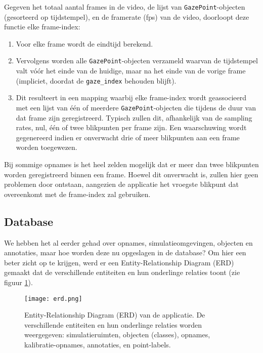Gegeven het totaal aantal frames in de video, de lijst van \texttt{GazePoint}-objecten (gesorteerd op tijdstempel), 
en de framerate (fps) van de video, doorloopt deze functie elke frame-index:
\begin{enumerate}
  \item Voor elke frame wordt de eindtijd berekend.
  \item Vervolgens worden alle \texttt{GazePoint}-objecten verzameld waarvan de tijdstempel valt vóór het einde van de huidige, 
  maar na het einde van de vorige frame (impliciet, doordat de \texttt{gaze\_index} behouden blijft).
  \item Dit resulteert in een mapping waarbij elke frame-index wordt geassocieerd met een lijst van één of meerdere 
  \texttt{GazePoint}-objecten die tijdens de duur van dat frame zijn geregistreerd. 
  Typisch zullen dit, afhankelijk van de sampling rates, nul, één of twee blikpunten per frame zijn. 
  Een waarschuwing wordt gegenereerd indien er onverwacht drie of meer blikpunten aan een frame worden toegewezen.
\end{enumerate}

Bij sommige opnames is het heel zelden mogelijk dat er meer dan twee blikpunten worden geregistreerd binnen een frame.
Hoewel dit onverwacht is, zullen hier geen problemen door ontstaan, aangezien de 
applicatie het vroegste blikpunt dat overeenkomt met de frame-index zal gebruiken.

\subsection{Database}

We hebben het al eerder gehad over opnames, simulatieomgevingen, objecten en annotaties, maar hoe worden deze nu opgeslagen in de database?
Om hier een beter zicht op te krijgen, werd er een Entity-Relationship Diagram (ERD) gemaakt dat de verschillende entiteiten en hun onderlinge relaties toont (zie figuur \ref{fig:erd}).

\begin{figure}[H]
  \centering
  \texttt{[image: erd.png]}
  \caption[
Entity-Relationship Diagram (ERD) van de applicatie
  ]{\label{fig:erd} Entity-Relationship Diagram (ERD) van de applicatie. De verschillende entiteiten en hun onderlinge relaties worden weergegeven: simulatieruimten, objecten (classes), opnames, kalibratie-opnames, annotaties, en point-labels. }
\end{figure}

